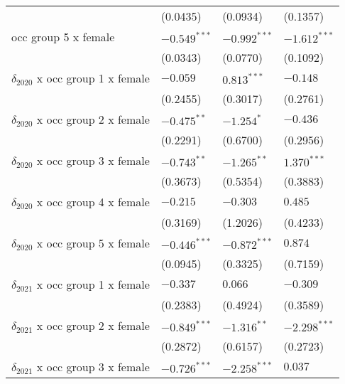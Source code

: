 \begin{tabular}{llll}
                                       &           (0.0435) &           (0.0934) &           (0.1357) \\
occ group 5 x female                   &     $-0.549^{***}$ &     $-0.992^{***}$ &     $-1.612^{***}$ \\
                                       &           (0.0343) &           (0.0770) &           (0.1092) \\
$\delta_{2020}$ x occ group 1 x female &           $-0.059$ &      $0.813^{***}$ &           $-0.148$ \\
                                       &           (0.2455) &           (0.3017) &           (0.2761) \\
$\delta_{2020}$ x occ group 2 x female &      $-0.475^{**}$ &         $-1.254^*$ &           $-0.436$ \\
                                       &           (0.2291) &           (0.6700) &           (0.2956) \\
$\delta_{2020}$ x occ group 3 x female &      $-0.743^{**}$ &      $-1.265^{**}$ &      $1.370^{***}$ \\
                                       &           (0.3673) &           (0.5354) &           (0.3883) \\
$\delta_{2020}$ x occ group 4 x female &           $-0.215$ &           $-0.303$ &            $0.485$ \\
                                       &           (0.3169) &           (1.2026) &           (0.4233) \\
$\delta_{2020}$ x occ group 5 x female &     $-0.446^{***}$ &     $-0.872^{***}$ &            $0.874$ \\
                                       &           (0.0945) &           (0.3325) &           (0.7159) \\
$\delta_{2021}$ x occ group 1 x female &           $-0.337$ &            $0.066$ &           $-0.309$ \\
                                       &           (0.2383) &           (0.4924) &           (0.3589) \\
$\delta_{2021}$ x occ group 2 x female &     $-0.849^{***}$ &      $-1.316^{**}$ &     $-2.298^{***}$ \\
                                       &           (0.2872) &           (0.6157) &           (0.2723) \\
$\delta_{2021}$ x occ group 3 x female &     $-0.726^{***}$ &     $-2.258^{***}$ &            $0.037$ \\

\end{tabular}
